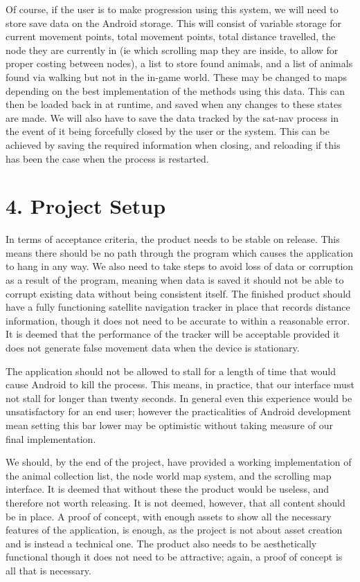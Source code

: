 \documentclass[]{report}
\begin{document}
Of course, if the user is to make progression using this system, we will need to store save data on the Android storage. This will consist of variable storage for current movement points, total movement points, total distance travelled, the node they are currently in (ie which scrolling map they are inside, to allow for proper costing between nodes), a list to store found animals, and a list of animals found via walking but not in the in-game world. These may be changed to maps depending on the best implementation of the methods using this data. This can then be loaded back in at runtime, and saved when any changes to these states are made. We will also have to save the data tracked by the sat-nav process in the event of it being forcefully closed by the user or the system. This can be achieved by saving the required information when closing, and reloading if this has been the case when the process is restarted.

\section*{4. Project Setup}

In terms of acceptance criteria, the product needs to be stable on release. This means there should be no path through the program which causes the application to hang in any way. We also need to take steps to avoid loss of data or corruption as a result of the program, meaning when data is saved it should not be able to corrupt existing data without being consistent itself. The finished product should have a fully functioning satellite navigation tracker in place that records distance information, though it does not need to be accurate to within a reasonable error. It is deemed that the performance of the tracker will be acceptable provided it does not generate false movement data when the device is stationary. 

The application should not be allowed to stall for a length of time that would cause Android to kill the process. This means, in practice, that our interface must not stall for longer than twenty seconds. In general even this experience would be unsatisfactory for an end user; however the practicalities of Android development mean setting this bar lower may be optimistic without taking measure of our final implementation.

We should, by the end of the project, have provided a working implementation of the animal collection list, the node world map system, and the scrolling map interface. It is deemed that without these the product would be useless, and therefore not worth releasing. It is not deemed, however, that all content should be in place. A proof of concept, with enough assets to show all the necessary features of the application, is enough, as the project is not about asset creation and is instead a technical one. The product also needs to be aesthetically functional though it does not need to be attractive; again, a proof of concept is all that is necessary.
\end{document}
